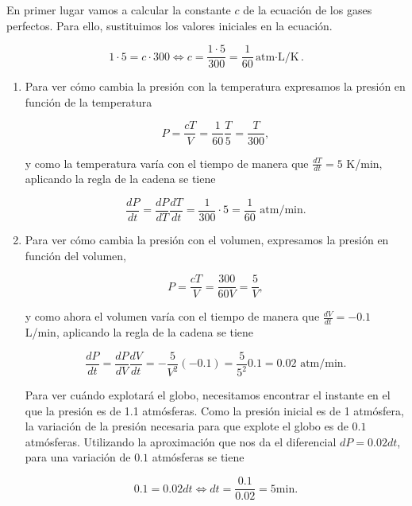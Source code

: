 \documentclass[
  spanish,
  a4paper,
]{scrreport}
\theoremstyle{definition}
\theoremstyle{remark}
\begin{document}
\begin{tcolorbox}[enhanced jigsaw, arc=.35mm, bottomrule=.15mm, bottomtitle=1mm, breakable, colback=white, colbacktitle=quarto-callout-tip-color!10!white, colframe=quarto-callout-tip-color-frame, coltitle=black, left=2mm, leftrule=.75mm, opacityback=0, opacitybacktitle=0.6, rightrule=.15mm, title=\textcolor{quarto-callout-tip-color}{\faLightbulb}\hspace{0.5em}{Solución}, titlerule=0mm, toprule=.15mm, toptitle=1mm]

En primer lugar vamos a calcular la constante \(c\) de la ecuación de
los gases perfectos. Para ello, sustituimos los valores iniciales en la
ecuación.

\[
1\cdot 5 = c\cdot 300 \Leftrightarrow c = \frac{1\cdot 5}{300} = \frac{1}{60} \mbox{atm$\cdot$L/K}.
\]

\begin{enumerate}
\def\labelenumi{\alph{enumi}.}
\item
  Para ver cómo cambia la presión con la temperatura expresamos la
  presión en función de la temperatura

  \[
  P = \frac{cT}{V} = \frac{1}{60}\frac{T}{5} = \frac{T}{300},
  \]

  y como la temperatura varía con el tiempo de manera que
  \(\frac{dT}{dt} = 5\) K/min, aplicando la regla de la cadena se tiene

  \[
  \frac{dP}{dt} 
  = \frac{dP}{dT}\frac{dT}{dt}
  = \frac{1}{300}\cdot 5 
  = \frac{1}{60} \mbox{ atm/min}.
  \]
\item
  Para ver cómo cambia la presión con el volumen, expresamos la presión
  en función del volumen,

  \[
  P = \frac{cT}{V} = \frac{300}{60V} = \frac{5}{V},
  \]

  y como ahora el volumen varía con el tiempo de manera que
  \(\frac{dV}{dt} = -0.1\) L/min, aplicando la regla de la cadena se
  tiene

  \[
  \frac{dP}{dt} 
  = \frac{dP}{dV}\frac{dV}{dt}
  = -\frac{5}{V^2} (-0.1) 
  = \frac{5}{5^2} 0.1
  = 0.02 \mbox{ atm/min}.
  \]

  Para ver cuándo explotará el globo, necesitamos encontrar el instante
  en el que la presión es de 1.1 atmósferas. Como la presión inicial es
  de 1 atmósfera, la variación de la presión necesaria para que explote
  el globo es de \(0.1\) atmósferas. Utilizando la aproximación que nos
  da el diferencial \(dP = 0.02 dt\), para una variación de \(0.1\)
  atmósferas se tiene

  \[
  0.1 = 0.02 dt \Leftrightarrow dt = \frac{0.1}{0.02} = 5 \mbox{min}.
  \]
\end{enumerate}

\end{tcolorbox}
\end{document}
